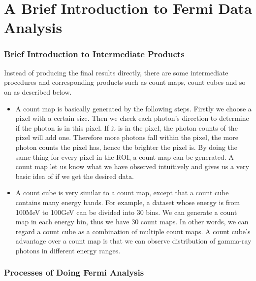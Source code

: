 \documentclass[12pt]{report}
\newcommand{\mayAdd}[1]{
  $<$\colorbox{red}{\textbf{mayAdd}}$>$#1$<$\colorbox{red}{\textbf{/mayAdd}}$>$
}
\begin{document}
        \section{A Brief Introduction to Fermi Data Analysis}
          \subsubsection{Brief Introduction to Intermediate Products}
            Instead of producing the final results directly, there are some intermediate procedures and 
            corresponding products such as count maps, count cubes and so on as described below.

          \begin{itemize}
            \item A count map is basically generated by the following steps. Firstly we choose a 
              pixel with a certain size. Then we check each photon's direction to determine if the photon is in this 
              pixel. If it is in the pixel, the photon counts of the pixel will add one. Therefore more photons fall within 
              the pixel, the more photon counts the pixel has, hence the brighter the pixel is. By doing the same thing 
              for every pixel in the ROI, a count map can be generated. 
              A count map let us know what we have observed intuitively and 
              gives us a very basic idea of if we get the desired data. 
            \item A count cube is very similar to a count map, except that a count cube contains many energy
              bands. For example, a dataset whose energy is from 100MeV to 100GeV can be divided into 30 bins. We can
              generate a count map in each energy bin, thus we have 30 count maps. In other words, we can regard a 
              count cube as a combination of multiple count maps. A count cube's advantage over a count map is that we can 
              observe distribution of gamma-ray photons in different energy ranges. 
          \end{itemize}

          \subsubsection{Processes of Doing Fermi Analysis}
          
\end{document}
